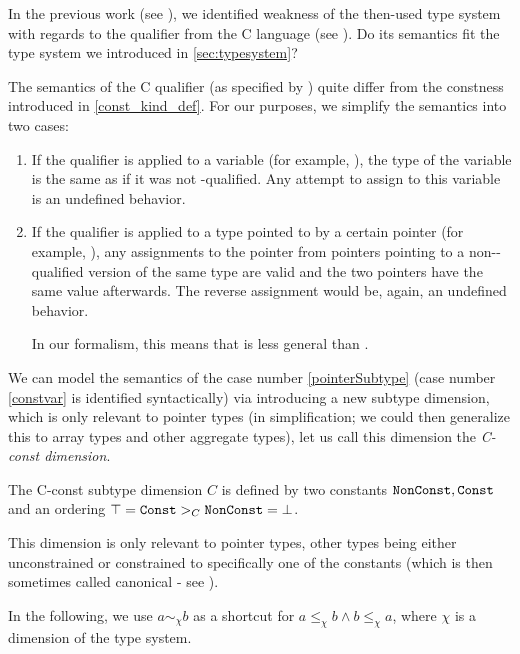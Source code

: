 In the previous work (see \cite{klepl2020type}), we identified weakness of the then-used type system with regards to the  qualifier from the C language (see \cite{cstandard2018}). Do its semantics fit the type system we introduced in \cref{sec:typesystem}?

The semantics of the C  qualifier (as specified by \cite{cstandard2018}) quite differ from the constness introduced in \cref{const_kind_def}. For our purposes, we simplify the semantics into two cases:

\begin{enumerate}
    \item If the  qualifier is applied to a variable (for example, ), the type of the variable is the same as if it was not -qualified. Any attempt to assign to this variable is an undefined behavior. \label{constvar}

    \item If the  qualifier is applied to a type pointed to by a certain pointer (for example, ), any assignments to the pointer from pointers pointing to a non--qualified version of the same type are valid and the two pointers have the same value afterwards. The reverse assignment would be, again, an undefined behavior. \label{pointerSubtype}

    In our formalism, this means that  is less general than .
\end{enumerate}

We can model the semantics of the case number \ref{pointerSubtype} (case number \ref{constvar} is identified syntactically) via introducing a new subtype dimension, which is only relevant to pointer types (in simplification; we could then generalize this to array types and other aggregate types), let us call this dimension the \emph{C-const dimension}.

\begin{defn}
    The C-const subtype dimension $C$ is defined by two constants $\mathtt{NonConst}, \mathtt{Const}$ and an ordering $\top = \mathtt{Const} >_C \mathtt{NonConst} = \bot$.

    This dimension is only relevant to pointer types, other types being either unconstrained or constrained to specifically one of the constants (which is then sometimes called canonical - see \cite{tiuryn1999subtyping}).
\end{defn}

In the following, we use $a \sim_\chi b$ as a shortcut for $a \leq_\chi b \land b \leq_\chi a$, where $\chi$ is a dimension of the type system.

